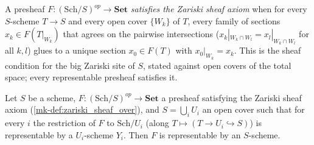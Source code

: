 \begin{definition}\label{mk-def:zariski_sheaf_over}
  \leanok

  A presheaf \(F : (\mathrm{Sch}/S)^{op} \to \mathbf{Set}\) \emph{satisfies
  the Zariski sheaf axiom} when for every \(S\)-scheme \(T \to S\) and every
  open cover \(\{W_k\}\) of \(T\), every family of sections
  \(x_k \in F(T|_{W_k})\) that agrees on the pairwise intersections
  (\(x_k|_{W_k \cap W_l} = x_l|_{W_k \cap W_l}\) for all \(k, l\)) glues to a
  unique section \(x_0 \in F(T)\) with \(x_0|_{W_k} = x_k\).  This is the
  sheaf condition for the big Zariski site of \(S\), stated against open
  covers of the total space; every representable presheaf satisfies it.
\end{definition}

\begin{theorem}\label{mk-thm:representability_zariski_descent}
  \leanok

  Let \(S\) be a scheme, \(F : (\mathrm{Sch}/S)^{op} \to \mathbf{Set}\) a
  presheaf satisfying the Zariski sheaf axiom
  (\ref{mk-def:zariski_sheaf_over}), and \(S = \bigcup_i U_i\) an open cover
  such that for every \(i\) the restriction of \(F\) to
  \(\mathrm{Sch}/U_i\) (along \(T \mapsto (T \to U_i \hookrightarrow S)\))
  is representable by a \(U_i\)-scheme \(Y_i\).  Then \(F\) is representable
  by an \(S\)-scheme.
\end{theorem}

